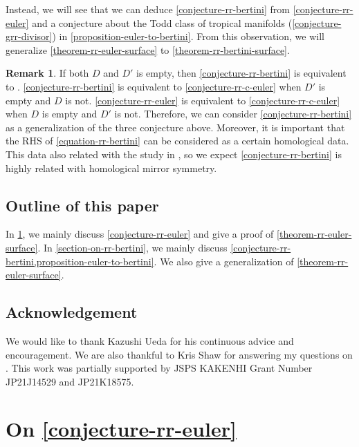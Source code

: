 \documentclass[a4paper,dvipdfmx,reqno,12pt]{amsart}
\theoremstyle{definition}
\newtheorem{remark}[theorem]{Remark}
\numberwithin{equation}{section}
\begin{document}
Instead, we will see that we can deduce
\cref{conjecture-rr-bertini} from 
\cref{conjecture-rr-euler} and 
a conjecture about the Todd class of tropical 
manifolds (\cref{conjecture-grr-divisor})
in \cref{proposition-euler-to-bertini}.
From this observation, we will
generalize \cref{theorem-rr-euler-surface}
to \cref{theorem-rr-bertini-surface}.
\begin{remark}
If both $D$ and $D'$ is empty, then
\cref{conjecture-rr-bertini} is equivalent to
\cite[Conjecture 6.13]{demedrano2023chern}.
\cref{conjecture-rr-bertini} is equivalent to
\cref{conjecture-rr-c-euler} when 
$D'$ is empty and $D$ is not.
\cref{conjecture-rr-euler} is 
equivalent to
\cref{conjecture-rr-c-euler} when 
$D$ is empty and $D'$ is not.
Therefore, we can consider 
\cref{conjecture-rr-bertini} as a generalization
of the three conjecture above.
Moreover, it is important that 
the RHS of \eqref{equation-rr-bertini} 
can be considered as a certain homological data.
This data also related with the study in 
\cite{tsutsui2023graded}, so we expect 
\cref{conjecture-rr-bertini} is highly related
with homological mirror symmetry.
\end{remark}

\subsection{Outline of this paper}
In \cref{section-on-rr-euler}, we mainly
discuss \cref{conjecture-rr-euler} and
give a proof of \cref{theorem-rr-euler-surface}.
In \cref{section-on-rr-bertini}, we mainly
discuss \cref{conjecture-rr-bertini,proposition-euler-to-bertini}.
We also give a generalization of
\cref{theorem-rr-euler-surface}.

\subsection*{Acknowledgement}
We would like to thank Kazushi Ueda for his continuous advice
and encouragement. We are also thankful to Kris Shaw
for answering my questions on
\cite{shaw2015tropical,demedrano2023chern}.
This work was partially supported 
by JSPS KAKENHI Grant Number JP21J14529 and JP21K18575.

\section{On \cref{conjecture-rr-euler}}
\label{section-on-rr-euler}
\end{document}
